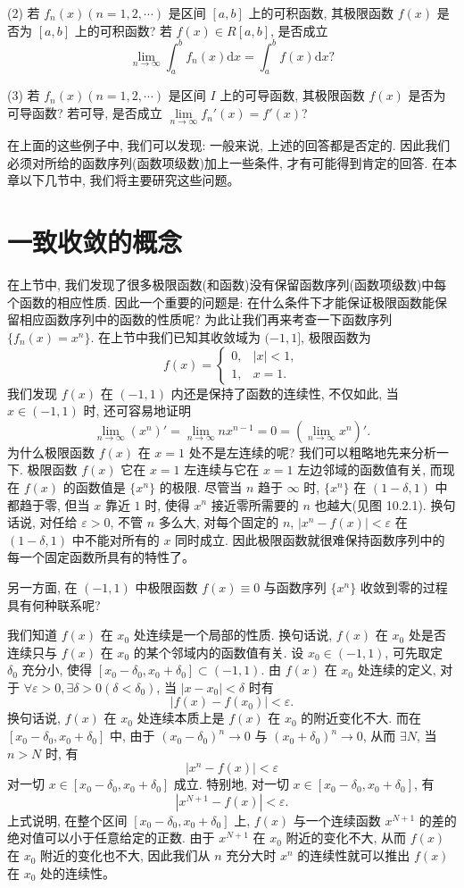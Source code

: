 \documentclass[UTF8, 12pt, fontset=fandol, oneside]{ctexart}
\begin{document}
(2) 若 $f_n(x)(n=1,2,\cdots)$ 是区间 $[a,b]$ 上的可积函数, 其极限函数 $f(x)$ 是否为 $[a,b]$ 上的可积函数? 若 $f(x)\in R[a,b]$, 是否成立
\[
  \lim_{n\to\infty}\int_a^b f_n(x)\mathrm dx=\int_a^b f(x)\mathrm dx?
\]

(3) 若 $f_n(x)(n=1,2,\cdots)$ 是区间 $I$ 上的可导函数, 其极限函数 $f(x)$ 是否为可导函数? 若可导, 是否成立 $\lim\limits_{n\to\infty}f_n'(x)=f'(x)$?

在上面的这些例子中, 我们可以发现: 一般来说, 上述的回答都是否定的. 因此我们必须对所给的函数序列(函数项级数)加上一些条件, 才有可能得到肯定的回答. 在本章以下几节中, 我们将主要研究这些问题。

\section{一致收敛的概念}

在上节中, 我们发现了很多极限函数(和函数)没有保留函数序列(函数项级数)中每个函数的相应性质. 因此一个重要的问题是: 在什么条件下才能保证极限函数能保留相应函数序列中的函数的性质呢? 为此让我们再来考查一下函数序列 $\{f_n(x)=x^n\}$. 在上节中我们已知其收敛域为 $(-1,1]$, 极限函数为
\[
  f(x)=
  \begin{cases}
    0, & |x|<1,\\
    1, & x=1.
  \end{cases}
\]
我们发现 $f(x)$ 在 $(-1,1)$ 内还是保持了函数的连续性, 不仅如此, 当 $x\in(-1,1)$ 时, 还可容易地证明
\[
  \lim_{n\to\infty}(x^n)'=\lim_{n\to\infty}nx^{n-1}=0=\left(\lim_{n\to\infty}x^n\right)'.
\]
为什么极限函数 $f(x)$ 在 $x=1$ 处不是左连续的呢? 我们可以粗略地先来分析一下. 极限函数 $f(x)$ 它在 $x=1$ 左连续与它在 $x=1$ 左边邻域的函数值有关, 而现在 $f(x)$ 的函数值是 $\{x^n\}$ 的极限. 尽管当 $n$ 趋于 $\infty$ 时, $\{x^n\}$ 在 $(1-\delta,1)$ 中都趋于零, 但当 $x$ 靠近 $1$ 时, 使得 $x^n$ 接近零所需要的 $n$ 也越大(见图 10.2.1). 换句话说, 对任给 $\varepsilon>0$, 不管 $n$ 多么大, 对每个固定的 $n$, $|x^n-f(x)|<\varepsilon$ 在 $(1-\delta,1)$ 中不能对所有的 $x$ 同时成立. 因此极限函数就很难保持函数序列中的每一个固定函数所具有的特性了。

另一方面, 在 $(-1,1)$ 中极限函数 $f(x)\equiv0$ 与函数序列 $\{x^n\}$ 收敛到零的过程具有何种联系呢?

我们知道 $f(x)$ 在 $x_0$ 处连续是一个局部的性质. 换句话说, $f(x)$ 在 $x_0$ 处是否连续只与 $f(x)$ 在 $x_0$ 的某个邻域内的函数值有关. 设 $x_0\in(-1,1)$, 可先取定 $\delta_0$ 充分小, 使得 $[x_0-\delta_0,x_0+\delta_0]\subset(-1,1)$. 由 $f(x)$ 在 $x_0$ 处连续的定义, 对于 $\forall\varepsilon>0,\exists\delta>0(\delta<\delta_0)$, 当 $|x-x_0|<\delta$ 时有
\[
  |f(x)-f(x_0)|<\varepsilon.
\]
换句话说, $f(x)$ 在 $x_0$ 处连续本质上是 $f(x)$ 在 $x_0$ 的附近变化不大. 而在 $[x_0-\delta_0,x_0+\delta_0]$ 中, 由于 $(x_0-\delta_0)^n\to0$ 与 $(x_0+\delta_0)^n\to0$, 从而 $\exists N$, 当 $n>N$ 时, 有
\[
  |x^n-f(x)|<\varepsilon
\]
对一切 $x\in[x_0-\delta_0,x_0+\delta_0]$ 成立. 特别地, 对一切 $x\in[x_0-\delta_0,x_0+\delta_0]$, 有
\[
  |x^{N+1}-f(x)|<\varepsilon.
\]
上式说明, 在整个区间 $[x_0-\delta_0,x_0+\delta_0]$ 上, $f(x)$ 与一个连续函数 $x^{N+1}$ 的差的绝对值可以小于任意给定的正数. 由于 $x^{N+1}$ 在 $x_0$ 附近的变化不大, 从而 $f(x)$ 在 $x_0$ 附近的变化也不大, 因此我们从 $n$ 充分大时 $x^n$ 的连续性就可以推出 $f(x)$ 在 $x_0$ 处的连续性。
\end{document}
